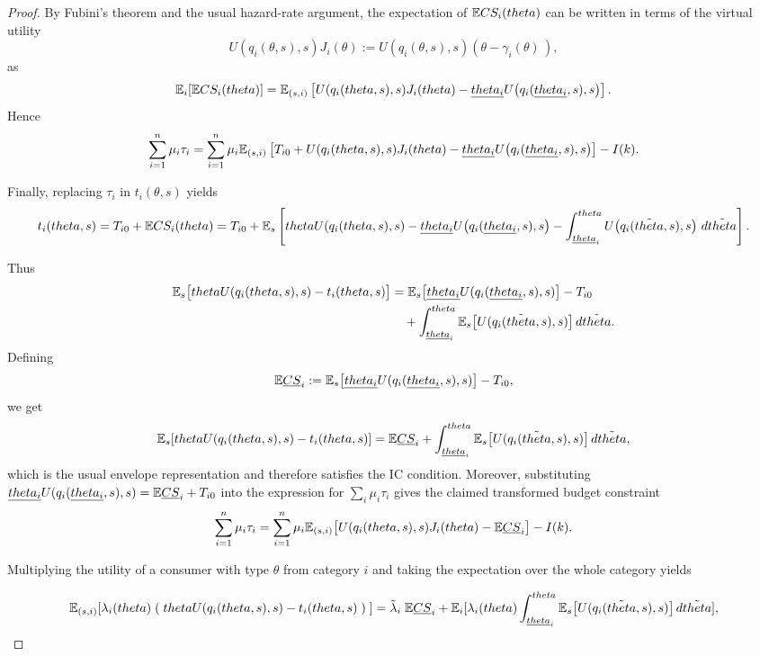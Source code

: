 \documentclass[master.tex]{subfiles}
\begin{document}
\begin{proof}
By Fubini's theorem and the usual hazard-rate argument, the expectation of $\mathbb{E} CS_i(theta)$ can be written in terms of the virtual utility
\[
U(q_i(\theta,s),s) J_i(\theta)
:= U\!\left(q_i(\theta,s),s\right)(\theta -
\gamma_i(\theta)\,),
\]
as
\[
\mathbb{E}_i[\mathbb{E} CS_i(theta)]
=
\mathbb{E}_{(s,i)}\left[
U(q_i(theta,s),s) J_i(theta)
- \underline{theta_i} U\!\left(q_i(\underline{theta_i},s),s\right)
\right].
\]
Hence
\[
\sum_{i=1}^n \mu_i \tau_i
=
\sum_{i=1}^n \mu_i \mathbb{E}_{(s,i)}\left[
T_{i0} + U(q_i(theta,s),s) J_i(theta) - \underline{theta_i} U\!\left(q_i(\underline{theta_i},s),s\right)
\right]
- I(k).
\]

Finally, replacing $\tau_i$ in $t_i(\theta,s)$ yields
\[
t_i(theta,s)
=
T_{i0}
+ \mathbb{E} CS_i(theta)
=
T_{i0}
+ \mathbb{E}_s\left[
theta U\!\left(q_i(theta,s),s\right)
- \underline{theta_i}U\!\left(q_i(\underline{theta_i},s),s\right)
- \int_{\underline{theta}_i}^{theta}
U\!\left(q_i(\tilde{theta},s),s\right)\, d\tilde{theta}
\right].
\]

Thus
\begin{align*}
\mathbb{E}_s\big[theta U(q_i(theta,s),s) - t_i(theta,s)\big]
&=
\mathbb{E}_s\big[\underline{theta_i}U(q_i(\underline{theta_i},s),s)\big]
- T_{i0}
\\
&\quad
+ \int_{\underline{theta}_i}^{theta}
\mathbb{E}_s\big[U(q_i(\tilde{theta},s),s)\big]\,d\tilde{theta}.
\end{align*}
Defining
\[
\mathbb{E}\underline{CS}_i
:=
\mathbb{E}_s\big[\underline{theta_i}U(q_i(\underline{theta_i},s),s)\big]
- T_{i0},
\]
we get
\[
\mathbb{E}_s[theta U(q_i(theta,s),s) - t_i(theta,s)]
=
\mathbb{E}\underline{CS}_i
+ \int_{\underline{theta}_i}^{theta}
\mathbb{E}_s\big[U(q_i(\tilde{theta},s),s)\big]\,d\tilde{theta},
\]
which is the usual envelope representation and therefore satisfies the IC condition. Moreover, substituting $\underline{theta_i}U(q_i(\underline{theta_i},s),s) = \mathbb{E}\underline{CS}_i + T_{i0}$ into the expression for $\sum_i \mu_i \tau_i$ gives the claimed transformed budget constraint
\[
\sum_{i=1}^n \mu_i \tau_i
=
\sum_{i=1}^n \mu_i \mathbb{E}_{(s,i)}\big[ U(q_i(theta,s),s) J_i(theta) - \mathbb{E}\underline{CS}_i\big]
- I(k).
\]

Multiplying the utility of a consumer with type $\theta$ from category $i$ and taking the expectation over the whole category yields

\[
\mathbb{E}_{(s,i)}[\lambda_i(theta) \;( \;theta U(q_i(theta,s),s) - t_i(theta,s)\;)\;]
=
\tilde{\lambda}_i \; \mathbb{E}\underline{CS}_i
+ \mathbb{E}_i[\lambda_i(theta)\int_{\underline{theta}_i}^{theta}
\mathbb{E}_s\big[U(q_i(\tilde{theta},s),s)\big]\,d\tilde{theta}],
\]


\end{proof}
\end{document}
